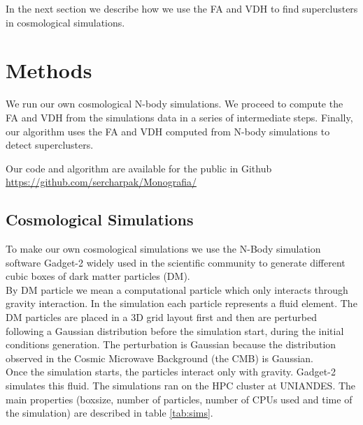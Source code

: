\documentclass[12pt]{article}
\begin{document}
In the next section we describe how we use the FA and VDH
 to find superclusters in cosmological simulations.

\section{Methods}

\begin{par}
We run our own cosmological N-body simulations. We
 proceed to compute the FA and VDH from the simulations
  data in a series of intermediate steps. Finally, our
   algorithm uses the FA and VDH computed from N-body
    simulations to detect superclusters.
\end{par}

\begin{par}
Our code and algorithm are available for the
  public in Github
   \url{https://github.com/sercharpak/Monografia/}
\end{par}


\subsection{Cosmological Simulations}\label{sec:sims}
\begin{par}
To make our own cosmological simulations we use the N-Body simulation software Gadget-2
 \cite{springel_gadget_2_2005}
widely used in the scientific community to
 generate different cubic boxes of dark matter
  particles
  (DM). \\

By DM particle we mean a computational particle which only interacts through gravity
interaction. In the simulation each particle
 represents a fluid element. The DM particles are
placed in a 3D grid layout first and then are
 perturbed following a Gaussian distribution
before the simulation start, during the initial
 conditions generation. The perturbation is Gaussian because
  the distribution observed in the Cosmic Microwave
   Background (the CMB) is Gaussian. \\

Once the simulation starts, the particles interact only with
 gravity. Gadget-2 simulates this fluid. The simulations ran
  on the HPC cluster at UNIANDES.
  The main properties (boxsize, number of
   particles, number of CPUs used and time of the
    simulation) are described in table
     \ref{tab:sims}. \\
\end{par}
\end{document}
